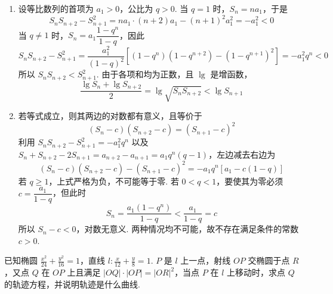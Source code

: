 \documentclass[UTF8,a4paper,oneside,11pt]{ctexbook}
\begin{document}
\begin{solution}
\begin{enumerate}
\item 设等比数列的首项为 \(a_1>0\)，公比为 \(q>0\). 当 \(q=1\) 时，\(S_n=na_1\)，于是
\[
S_nS_{n+2}-S_{n+1}^2
=na_1\cdot(n+2)a_1-(n+1)^2a_1^2
=-a_1^2<0
\]
当 \(q\ne1\) 时，\(S_n=a_1\dfrac{1-q^n}{1-q}\)，因此
\[
S_nS_{n+2}-S_{n+1}^2
=\frac{a_1^2}{(1-q)^2}\left[(1-q^n)(1-q^{n+2})-(1-q^{n+1})^2\right]
=-a_1^2q^n<0
\]
所以 \(S_nS_{n+2}<S_{n+1}^2\). 由于各项和均为正数，且 \(\lg\) 是增函数，
\[
\frac{\lg S_n+\lg S_{n+2}}2
=\lg\sqrt{S_nS_{n+2}}
<\lg S_{n+1}
\]

\item 若等式成立，则其两边的对数都有意义，且等价于
\[
(S_n-c)(S_{n+2}-c)=(S_{n+1}-c)^2
\]
利用 \(S_nS_{n+2}-S_{n+1}^2=-a_1^2q^n\) 以及 \(S_n+S_{n+2}-2S_{n+1}=a_{n+2}-a_{n+1}=a_1q^n(q-1)\)，左边减去右边为
\[
(S_n-c)(S_{n+2}-c)-(S_{n+1}-c)^2
=-a_1q^n\left[a_1-c(1-q)\right]
\]
若 \(q\geqslant1\)，上式严格为负，不可能等于零. 若 \(0<q<1\)，要使其为零必须 \(c=\dfrac{a_1}{1-q}\)，但此时
\[
S_n=\frac{a_1(1-q^n)}{1-q}<\frac{a_1}{1-q}=c
\]
所以 \(S_n-c<0\)，对数无意义. 两种情况均不可能，故不存在满足条件的常数 \(c>0\).
\end{enumerate}
\end{solution}

\begin{problem}
已知椭圆 \(\frac{x^2}{24} + \frac{y^2}{16} = 1\)，直线 \(l: \frac{x}{12} + \frac{y}{8} = 1\). \(P\) 是 \(l\) 上一点，射线 \(OP\) 交椭圆于点 \(R\)，又点 \(Q\) 在 \(OP\) 上且满足 \(|OQ| \cdot |OP| = |OR|^2\)，当点 \(P\) 在 \(l\) 上移动时，求点 \(Q\) 的轨迹方程，并说明轨迹是什么曲线.
\end{problem}
\end{document}
